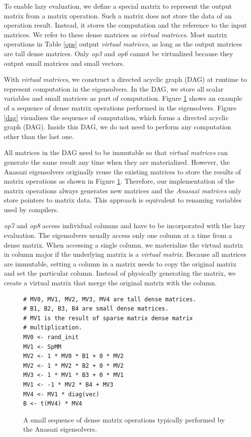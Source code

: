 To enable lazy evaluation, we define a special matrix to represent the output
matrix from a matrix operation. Such a matrix does not store the data of
an operation result. Instead, it stores the computation and the reference to
the input matrices. We refer to these dense matrices as \textit{virtual matrices}.
Most matrix operations in Table \ref{ops} output \textit{virtual matrices},
as long as the output matrices are tall dense matrices. Only \textit{op3}
and \textit{op6} cannot be virtualized because they output small matrices and
small vectors.

With \textit{virtual matrices}, we construct a directed acyclic graph (DAG)
at runtime to represent computation in the eigensolvers. In the DAG, we store
all scalar variables and small matrices as part of computation.
Figure \ref{comp_seq} shows an example of a sequence of dense matrix operations
performed in the eigensolvers. Figure
\ref{dag} visualizes the sequence of computation, which forms a directed acyclic
graph (DAG). Inside this DAG, we do not need to perform any computation other
than the last one.

All matrices in the DAG need to be immutable so that \textit{virtual matrices}
can generate the same result any time when they are materialized. However,
the Anasazi eigensolvers originally reuse the existing matrices to store
the results of matrix operations as shown in Figure \ref{comp_seq}. Therefore,
our implementation of the matrix operations always generates new matrices and
the \textit{Anasazi matrices} only store pointers to matrix data. This approach
is equivalent to renaming variables used by compilers.

\textit{op7} and \textit{op8} access individual columns and have to be incorporated
with the lazy evaluation. The eigensolvers usually access only one column at a time
from a dense matrix. When accessing a single column, we materialize the virtual
matrix in column major if the underlying matrix is a \textit{virtual matrix}.
Because all matrices are immutable, setting a column in a matrix needs to
copy the original matrix and set the particular column. Instead of physically
generating the matrix, we create a virtual matrix that merge the original matrix
with the column.

\begin{figure}
\begin{verbatim}
# MV0, MV1, MV2, MV3, MV4 are tall dense matrices.
# B1, B2, B3, B4 are small dense matrices.
# MV1 is the result of sparse matrix dense matrix
# multiplication.
MV0 <- rand_init
MV1 <- SpMM
MV2 <- 1 * MV0 * B1 + 0 * MV2
MV2 <- 1 * MV2 * B2 + 0 * MV2
MV3 <- 1 * MV1 * B3 + 0 * MV1
MV1 <- -1 * MV2 * B4 + MV3
MV4 <- MV1 * diag(vec)
B <- t(MV4) * MV4
\end{verbatim}
\vspace{-5pt}
\caption{A small sequence of dense matrix operations typically performed by
the Anasazi eigensolvers.}
\label{comp_seq}
\end{figure}

